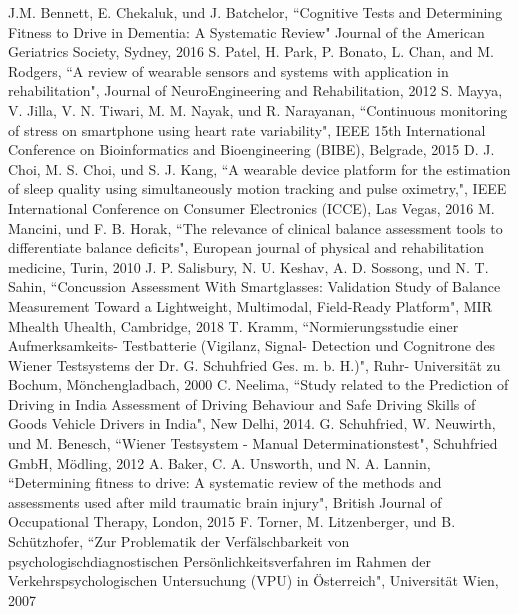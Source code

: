 \documentclass[conference]{IEEEtran}
\begin{document}
\begin{thebibliography}{00}
J.M. Bennett, E. Chekaluk, und J. Batchelor,
``Cognitive Tests and Determining Fitness to Drive in Dementia: A Systematic Review"
Journal of the American Geriatrics Society, Sydney, 2016
 S. Patel, H. Park, P. Bonato, L. Chan, and M. Rodgers, ``A review of wearable sensors and systems with application in rehabilitation", Journal of NeuroEngineering and Rehabilitation, 2012
 S. Mayya, V. Jilla, V. N. Tiwari, M. M. Nayak, und R. Narayanan, ``Continuous monitoring of stress on smartphone using heart rate variability", IEEE 15th International Conference on Bioinformatics and Bioengineering (BIBE), Belgrade, 2015
 D. J. Choi, M. S. Choi, und S. J. Kang, ``A wearable device platform for the estimation of sleep quality using simultaneously motion tracking and pulse oximetry,", IEEE International Conference on Consumer Electronics (ICCE), Las Vegas, 2016
 M. Mancini, und F. B. Horak, ``The relevance of clinical balance assessment tools to differentiate balance deficits", European journal of physical and rehabilitation medicine, Turin, 2010
J. P. Salisbury, N. U. Keshav, A. D. Sossong, und N. T. Sahin, ``Concussion Assessment With Smartglasses: Validation Study of Balance Measurement Toward a Lightweight, Multimodal, Field-Ready Platform", MIR Mhealth Uhealth, Cambridge, 2018
 T. Kramm, ``Normierungsstudie einer Aufmerksamkeits- Testbatterie (Vigilanz, Signal- Detection und Cognitrone des Wiener Testsystems der Dr. G. Schuhfried Ges. m. b. H.)", Ruhr- Universität zu Bochum, Mönchengladbach, 2000
 C. Neelima, ``Study related to the Prediction of Driving in India Assessment of Driving Behaviour and Safe Driving Skills of Goods Vehicle Drivers in India", New Delhi, 2014. 
 G. Schuhfried, W. Neuwirth, und M. Benesch, ``Wiener Testsystem - Manual Determinationstest", Schuhfried GmbH, Mödling, 2012
A. Baker, C. A. Unsworth, und N. A. Lannin,
``Determining fitness to drive: A systematic review of the methods and assessments used after mild traumatic brain injury", British Journal of Occupational Therapy, London, 2015
 F. Torner, M. Litzenberger, und B. Schützhofer, ``Zur Problematik der Verfälschbarkeit von psychologischdiagnostischen Persönlichkeitsverfahren im Rahmen der Verkehrspsychologischen Untersuchung (VPU) in Österreich", Universität Wien, 2007

\end{thebibliography}
\end{document}
